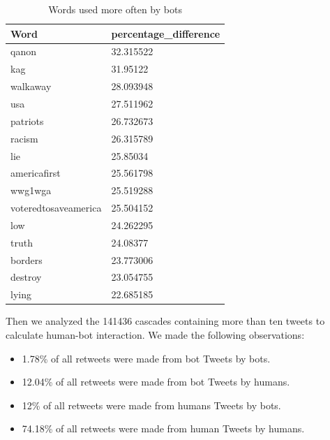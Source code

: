 \documentclass[letterpaper]{article}
\begin{document}
\begin{table}[h]
    \begin{tabular}{|l|l|}
    \hline
    \textbf{Word}        & \textbf{percentage\_difference} \\ \hline
    qanon                & 32.315522                       \\ \hline
    kag                  & 31.95122                        \\ \hline
    walkaway             & 28.093948                       \\ \hline
    usa                  & 27.511962                       \\ \hline
    patriots             & 26.732673                       \\ \hline
    racism               & 26.315789                       \\ \hline
    lie                  & 25.85034                        \\ \hline
    americafirst         & 25.561798                       \\ \hline
    wwg1wga              & 25.519288                       \\ \hline
    voteredtosaveamerica & 25.504152                       \\ \hline
    low                  & 24.262295                       \\ \hline
    truth                & 24.08377                        \\ \hline
    borders              & 23.773006                       \\ \hline
    destroy              & 23.054755                       \\ \hline
    lying                & 22.685185                       \\ \hline
\end{tabular}
\caption{Words used more often by bots}
\label{tab:bot-dominant-words}
\end{table}

Then we analyzed the 141436 cascades containing more than ten tweets to calculate human-bot interaction. 
We made the following observations: 

\begin{itemize}
    \item 1.78\% of all retweets were made from bot Tweets by bots.
    \item 12.04\% of all retweets were made from bot Tweets by humans.
    \item 12\% of all retweets were made from humans Tweets by bots.
    \item 74.18\% of all retweets were made from human Tweets by humans.
\end{itemize}
\end{document}
